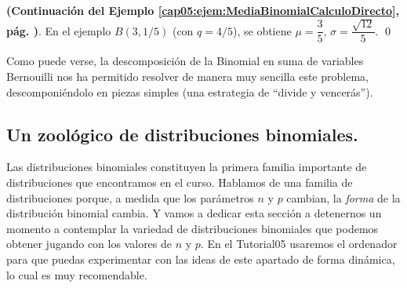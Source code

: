     \begin{center}
    \end{center}
\begin{ejemplo}
{\bf (Continuación del Ejemplo \ref{cap05:ejem:MediaBinomialCalculoDirecto}, pág. \pageref{cap05:ejem:MediaBinomialCalculoDirecto})}.
\label{cap05:ejem:MediaBinomialCalculoFormula}
En el ejemplo $B(3,1/5)$ (con $q=4/5$), se obtiene $\mu=\dfrac{3}{5}$, $\sigma=\dfrac{\sqrt{12}}{5}$.
\qed
\end{ejemplo}
Como puede verse, la descomposición de la Binomial en suma de variables Bernouilli nos ha permitido resolver de manera muy sencilla este problema, descomponiéndolo en piezas simples (una estrategia de ``divide y vencerás'').

\subsection{Un  zoológico de distribuciones binomiales.}
\label{cap05:subsec:ZooDistribucionesBinomiales}

Las distribuciones binomiales constituyen la primera familia importante de distribuciones que
encontramos en el curso. Hablamos de una familia de distribuciones porque, a medida que los
parámetros $n$ y $p$ cambian, la {\em forma} de la distribución binomial cambia. Y vamos a dedicar
esta sección a detenernos un momento a contemplar la variedad de distribuciones binomiales que
podemos obtener jugando con los valores de $n$ y $p$. En el Tutorial05 usaremos el ordenador para que puedas experimentar con las ideas de este apartado de forma dinámica, lo cual es muy recomendable.

